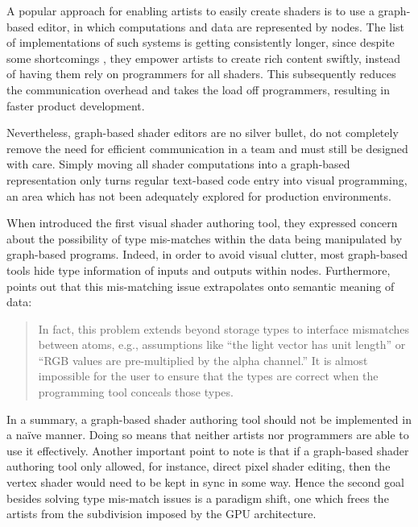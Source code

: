 A popular approach for enabling artists to easily create shaders is to use a graph-based editor, in which computations and data are represented by nodes. The list of implementations of such systems is getting consistently longer, since despite some shortcomings \cite{ChristerGraphShaderEditorsSuck}, they empower artists to create rich content swiftly, instead of having them rely on programmers for all shaders. This subsequently reduces the communication overhead and takes the load off programmers, resulting in faster product development.

Nevertheless, graph-based shader editors are no silver bullet, do not completely remove the need for efficient communication in a team and must still be designed with care. Simply moving all shader computations into a graph-based representation only turns regular text-based code entry into visual programming, an area which has not been adequately explored for production environments.

When \citet{AbramWhitted90} introduced the first visual shader authoring tool, they expressed concern about the possibility of type mis-matches within the data being manipulated by graph-based programs. Indeed, in order to avoid visual clutter, most graph-based tools hide type information of inputs and outputs within nodes. Furthermore, \citet{mcguire2006shadetrees} points out that this mis-matching issue extrapolates onto semantic meaning of data:
	
\begin{quote}
In fact, this problem extends beyond storage types to interface mismatches between atoms, e.g., assumptions like “the light vector has unit length” or “RGB values are pre-multiplied by the alpha channel.” It is almost impossible for the user to ensure that the types are correct when the programming tool conceals those types. 
\end{quote}

In a summary, a graph-based shader authoring tool should not be implemented in a naïve manner. Doing so means that neither artists nor programmers are able to use it effectively. Another important point to note is that if a graph-based shader authoring tool only allowed, for instance, direct pixel shader editing, then the vertex shader would need to be kept in sync in some way. Hence the second goal besides solving type mis-match issues is a paradigm shift, one which frees the artists from the subdivision imposed by the GPU architecture.

